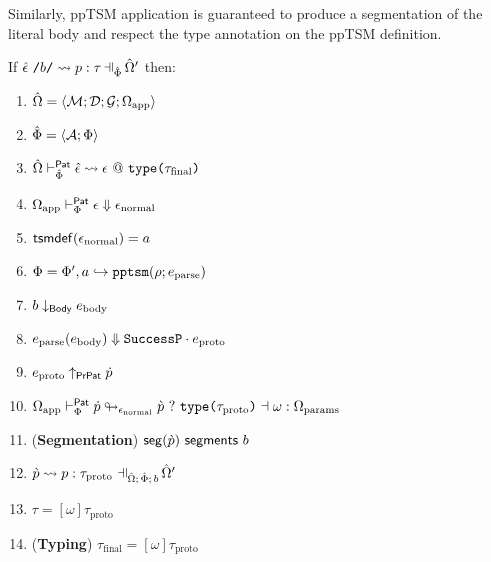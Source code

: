 Similarly, ppTSM application is guaranteed to produce a segmentation of the literal body and respect the type annotation on the ppTSM definition.
\begingroup
\def\thetheorem{\ref{thm:pptsm-reasoning-principles}}
\begin{theorem}
If $\patExpandsP{\uOmega'}{\uPhi}{\utsmap{\uepsilon}{b}}{p}{\tau}$ then:
\begin{enumerate}
  \item ${\hat\Omega}=\langle \mathcal{M}; \mathcal{D}; \mathcal{G}; \Omega_\text{app} \rangle$
  \item $\hat\Phi=\langle \mathcal{A}; \Phi \rangle$
  \item ${\hat\Omega} \vdash_{\hat\Phi}^{\mathsf{Pat}} {\hat\epsilon} \leadsto \epsilon~@~\texttt{type}\texttt{(}\tau_\text{final}\texttt{)}$
  \item $\Omega_\text{app} \vdash_{\Phi}^\mathsf{Pat} \epsilon \Downarrow \epsilon_\text{normal}$
  \item $\mathsf{tsmdef}(\epsilon_\text{normal})=a$
  \item $\Phi = \Phi', a \hookrightarrow \texttt{pptsm}(\rho; e_\text{parse})$
  \item $b \downarrow_\mathsf{Body} e_\text{body}$
  \item $e_\text{parse}(e_\text{body}) \Downarrow {\mathtt{SuccessP}}\cdot{e_\text{proto}}$
  \item $e_\text{proto} \uparrow_\mathsf{PrPat} \dot{p}$
  \item $\Omega_\text{app} \vdash_{\Phi}^\mathsf{Pat} \dot{p} \looparrowright_{\epsilon_\text{normal}} \grave{p} ~?~ \texttt{type}\texttt{(}\tau_\text{proto}\texttt{)} \dashv \omega : \Omega_\text{params}$
  \item (\textbf{Segmentation}) $\mathsf{seg}(\grave{p})~\mathsf{segments}~b$
  \item $\cvalidPP{\uOmega'}{\psceneP{\uOmega}{\uPhi}{b}}{\cpv}{p}{\tau_\text{proto}}$
  \item $\tau = [\omega]\tau_\text{proto}$
  \item (\textbf{Typing}) $\tau_\text{final} = [\omega]\tau_\text{proto}$
\end{enumerate}
\end{theorem}
\endgroup

